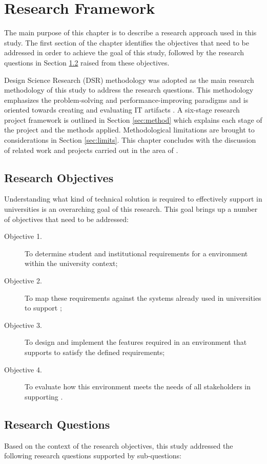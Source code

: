 \chapter{Research Framework\label{cha:method}}
The main purpose of this chapter is to describe a research approach used in this
study. The first section of the chapter identifies the objectives that need to
be addressed in order to achieve the goal of this study, followed by the research
questions in Section \ref{sec:questions} raised from these objectives.

Design Science Research (DSR) methodology was adopted as the main research
methodology of this study to address the research questions. This methodology
emphasizes the problem-solving and performance-improving paradigms and is
oriented towards creating and evaluating IT artifacts \citep{Hevner2004}. A
six-stage research project framework is outlined in Section \ref{sec:method}
which explains each stage of the project and the methods applied. Methodological
limitations are brought to considerations in Section \ref{sec:limits}. This
chapter concludes with the discussion of related work and projects carried out
in the area of \LLLsn.

\section{Research Objectives}

Understanding what kind of technical solution is required to effectively support
\LLLs in universities is an overarching goal of this research. This goal brings
up a number of objectives that need to be addressed:
\begin{description}
  \item[Objective 1.] To determine student and institutional requirements for a
  \LLLs environment within the university context;
  \item[Objective 2.] To map these requirements against the systems already used
  in universities to support \LLLsn;
  \item[Objective 3.] To design and implement the features required in an
  environment that supports \LLLs to satisfy the defined requirements;
  \item[Objective 4.] To evaluate how this environment meets the needs of all
  stakeholders in supporting \LLLsn.
\end{description}

\section{Research Questions}
\label{sec:questions}
Based on the context of the research objectives, this study addressed the
following research questions supported by sub-questions:

